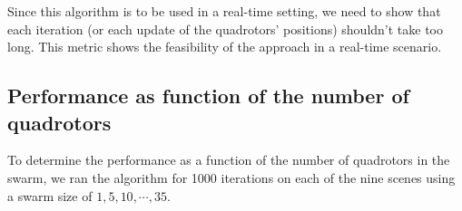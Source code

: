 \documentclass{article}
\begin{document}
Since this algorithm is to be used in a real-time setting, we need to show that
each iteration (or each update of the quadrotors' positions) shouldn't take too
long. This metric shows the feasibility of the approach in a real-time
scenario.

\subsection{Performance as function of the number of quadrotors}

To determine the performance as a function of the number of quadrotors in the
swarm, we ran the algorithm for 1000 iterations on each of the nine scenes
using a swarm size of $1, 5, 10, \cdots, 35$.

 
\end{document}
